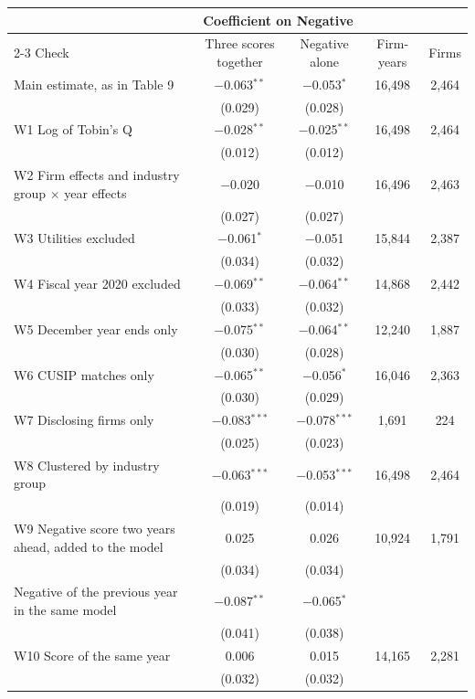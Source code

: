 \begin{tabular}{lcccc}
\toprule
 & \multicolumn{2}{c}{Coefficient on Negative} & & \\
\cmidrule(lr){2-3}
Check & Three scores together & Negative alone & Firm-years & Firms \\
\midrule
Main estimate, as in Table 9 & $-$0.063$^{**}$ & $-$0.053$^{*}$ & 16,498 & 2,464 \\
 & (0.029) & (0.028) & & \\
\midrule
W1 Log of Tobin's Q & $-$0.028$^{**}$ & $-$0.025$^{**}$ & 16,498 & 2,464 \\
 & (0.012) & (0.012) & & \\
W2 Firm effects and industry group $\times$ year effects & $-$0.020 & $-$0.010 & 16,496 & 2,463 \\
 & (0.027) & (0.027) & & \\
W3 Utilities excluded & $-$0.061$^{*}$ & $-$0.051 & 15,844 & 2,387 \\
 & (0.034) & (0.032) & & \\
W4 Fiscal year 2020 excluded & $-$0.069$^{**}$ & $-$0.064$^{**}$ & 14,868 & 2,442 \\
 & (0.033) & (0.032) & & \\
W5 December year ends only & $-$0.075$^{**}$ & $-$0.064$^{**}$ & 12,240 & 1,887 \\
 & (0.030) & (0.028) & & \\
W6 CUSIP matches only & $-$0.065$^{**}$ & $-$0.056$^{*}$ & 16,046 & 2,363 \\
 & (0.030) & (0.029) & & \\
W7 Disclosing firms only & $-$0.083$^{***}$ & $-$0.078$^{***}$ & 1,691 & 224 \\
 & (0.025) & (0.023) & & \\
W8 Clustered by industry group & $-$0.063$^{***}$ & $-$0.053$^{***}$ & 16,498 & 2,464 \\
 & (0.019) & (0.014) & & \\
W9 Negative score two years ahead, added to the model & 0.025 & 0.026 & 10,924 & 1,791 \\
 & (0.034) & (0.034) & & \\
\quad Negative of the previous year in the same model & $-$0.087$^{**}$ & $-$0.065$^{*}$ &  &  \\
 & (0.041) & (0.038) & & \\
W10 Score of the same year & 0.006 & 0.015 & 14,165 & 2,281 \\
 & (0.032) & (0.032) & & \\
\bottomrule
\end{tabular}
